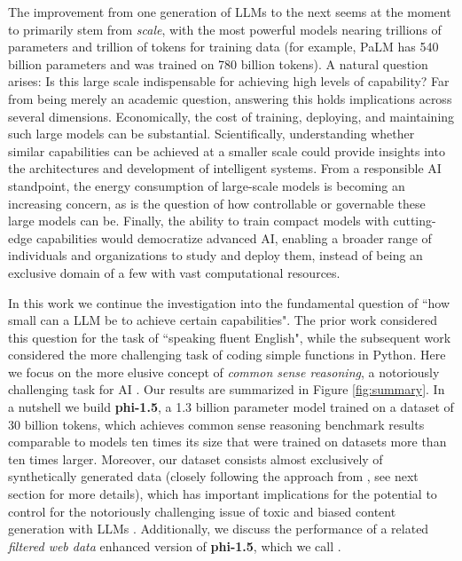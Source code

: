 The improvement from one generation of LLMs to the next seems at the moment to primarily stem from {\em scale}, with the most powerful models nearing trillions of parameters and trillion of tokens for training data (for example, PaLM \cite{chowdhery2022palm} has 540 billion parameters and was trained on 780 billion tokens). A natural question arises: Is this large scale indispensable for achieving high levels of capability? Far from being merely an academic question, answering this holds implications across several dimensions. Economically, the cost of training, deploying, and maintaining such large models can be substantial. Scientifically, understanding whether similar capabilities can be achieved at a smaller scale could provide insights into the architectures and development of intelligent systems. From a responsible AI standpoint, the energy consumption of large-scale models is becoming an increasing concern, as is the question of how controllable or governable these large models can be. Finally, the ability to train compact models with cutting-edge capabilities would democratize advanced AI, enabling a broader range of individuals and organizations to study and deploy them, instead of being an exclusive domain of a few with vast computational resources.

In this work we continue the investigation into the fundamental question of ``how small can a LLM be to achieve certain capabilities". The prior work \cite{eldan2023tinystories} considered this question for the task of ``speaking fluent English", while the subsequent work \cite{gunasekar2023textbooks} considered the more challenging task of coding simple functions in Python. Here we focus on the more elusive concept of {\em common sense reasoning}, a notoriously challenging task for AI \cite{sakaguchi2021winogrande}. Our results are summarized in Figure \ref{fig:summary}. In a nutshell we build \textbf{phi-1.5}, a 1.3 billion parameter model trained on a dataset of 30 billion tokens, which achieves common sense reasoning benchmark results comparable to models ten times its size that were trained on datasets more than ten times larger. Moreover, our dataset consists almost exclusively of synthetically generated data (closely following the approach from \cite{gunasekar2023textbooks}, see next section for more details), which has important implications for the potential to control for the notoriously challenging issue of toxic and biased content generation with LLMs \cite{bender2021dangers}. Additionally, we discuss the performance of a related \textit{filtered web data} enhanced version of \textbf{phi-1.5}, which we call \phionenl\!.

